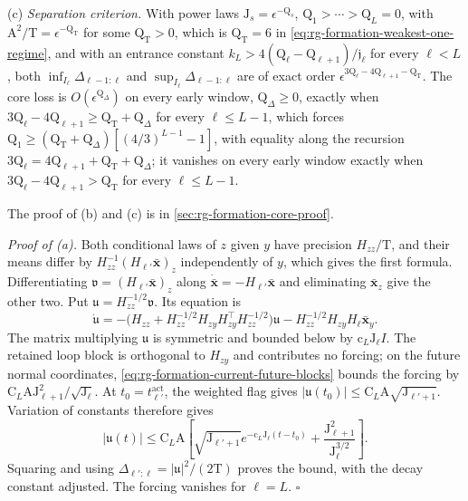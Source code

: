 (c) \emph{Separation criterion.} With power laws
\(\mathrm J_s=\epsilon^{-\mathrm Q_s}\), \(\mathrm Q_1>\cdots>\mathrm Q_L=0\),
with \(\mathrm A^2/\mathrm T=\epsilon^{-\mathrm Q_{\mathrm T}}\) for some
\(\mathrm Q_{\mathrm T}>0\), which is \(\mathrm Q_{\mathrm T}=6\) in \cref{eq:rg-formation-weakest-one-regime}, and with an entrance
constant \(k_L>4(\mathrm Q_\ell-\mathrm Q_{\ell+1})/\mathfrak j_\ell\) for
every \(\ell<L\), both \(\inf_{I_\ell}\Delta_{\ell-1:\ell}\) and
\(\sup_{I_\ell}\Delta_{\ell-1:\ell}\) are of exact order
\(\epsilon^{3\mathrm Q_\ell-4\mathrm Q_{\ell+1}-\mathrm Q_{\mathrm T}}\). The core loss is
\(O(\epsilon^{\mathrm Q_\Delta})\) on every early window, \(\mathrm Q_\Delta\ge0\), exactly when
\(3\mathrm Q_\ell-4\mathrm Q_{\ell+1}\ge\mathrm Q_{\mathrm T}+\mathrm Q_\Delta\) for every \(\ell\le L-1\), which
forces \(\mathrm Q_1\ge(\mathrm Q_{\mathrm T}+\mathrm Q_\Delta)[(4/3)^{L-1}-1]\), with
equality along the recursion
\(3\mathrm Q_\ell=4\mathrm Q_{\ell+1}+\mathrm Q_{\mathrm T}+\mathrm Q_\Delta\); it vanishes on every
early window exactly when \(3\mathrm Q_\ell-4\mathrm Q_{\ell+1}>\mathrm Q_{\mathrm T}\) for every
\(\ell\le L-1\). 

The proof of (b) and (c) is in \cref{sec:rg-formation-core-proof}.

\noindent\emph{Proof of (a).}
Both conditional laws of \(z\) given \(y\) have precision
\(H_{zz}/\mathrm T\), and their means differ by
\(H_{zz}^{-1}(H_{\ell'}\bar{\mathbf x})_z\) independently of \(y\), which gives
the first formula. Differentiating
\(\mathfrak v=(H_{\ell'}\bar{\mathbf x})_z\) along
\(\dot{\bar{\mathbf x}}=-H_{\ell'}\bar{\mathbf x}\) and eliminating
\(\bar{\mathbf x}_z\) give the other two. Put \(\mathfrak u=H_{zz}^{-1/2}\mathfrak v\). Its equation is
\[
\dot{\mathfrak u}
=-\bigl(H_{zz}+H_{zz}^{-1/2}H_{zy}H_{zy}^\top H_{zz}^{-1/2}\bigr)\mathfrak u
-H_{zz}^{-1/2}H_{zy}H_\ell\bar{\mathbf x}_y.
\]
The matrix multiplying \(\mathfrak u\) is symmetric and bounded below by
\(\mathrm c_L\mathrm J_\ell I\). The retained loop block is orthogonal to
\(H_{zy}\) and contributes no forcing; on the future normal coordinates,
\cref{eq:rg-formation-current-future-blocks} bounds the forcing by
\(\mathrm C_L\mathrm A\mathrm J_{\ell+1}^2/\sqrt{\mathrm J_\ell}\).
At \(t_0=t^{\mathrm{act}}_{\ell'}\), the weighted flag gives
\(|\mathfrak u(t_0)|\le\mathrm C_L\mathrm A\sqrt{\mathrm J_{\ell'+1}}\).
Variation of constants therefore gives
\[
|\mathfrak u(t)|\le\mathrm C_L\mathrm A\left[
\sqrt{\mathrm J_{\ell'+1}}e^{-\mathrm c_L\mathrm J_\ell(t-t_0)}
+\frac{\mathrm J_{\ell+1}^2}{\mathrm J_\ell^{3/2}}\right].
\]
Squaring and using \(\Delta_{\ell':\ell}=|\mathfrak u|^2/(2\mathrm T)\)
proves the bound, with the decay constant adjusted. The forcing vanishes for
\(\ell=L\). \(\square\)


